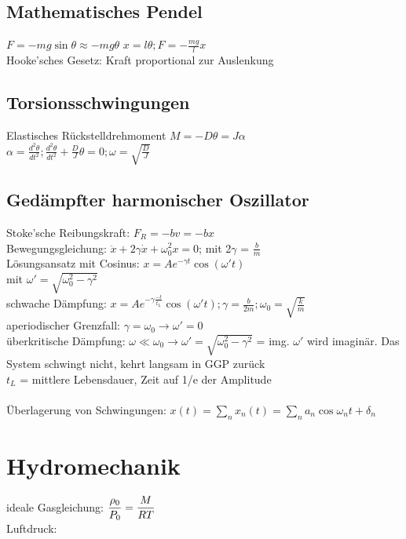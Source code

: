 \documentclass[fs, footer]{latex4ei}
\begin{document}
\begin{multicols*}{4}
\subsection{Mathematisches Pendel} $F = -mg \sin \theta \approx -mg \theta$ %
$x = l\theta ; F=-\frac{mg}{l}x$\\
Hooke'sches Gesetz: Kraft proportional zur Auslenkung\\
\subsection{Torsionsschwingungen}
Elastisches Rückstelldrehmoment $M = -D\theta = J\alpha$\\
$\alpha = \frac{d^2 \theta}{dt^2}; \frac{d^2\theta}{dt^2}+\frac{D}{J}\theta	= 0; \omega = \sqrt{\frac{D}{J}}$\\
\subsection{Gedämpfter harmonischer Oszillator}
Stoke'sche Reibungskraft: $F_R = -bv = -bx$\\
Bewegungsgleichung: $\ddot{x} + 2\gamma \dot{x} + \omega_0^2x = 0$; mit 2$\gamma$ = $\frac{b}{m}$\\
Lösungsansatz mit Cosinus: $x = Ae^{-\gamma t} \cos(\omega 't)$ \\mit $\omega ' = \sqrt{\omega_0^2-\gamma^2}$\\
schwache Dämpfung: $x = Ae^{-\gamma \frac{-t}{t_L}} \cos(\omega 't); \gamma = \frac{b}{2m}; \omega_0 = \sqrt{\frac{k}{m}}$\\
aperiodischer Grenzfall: $\gamma = \omega_0 \rightarrow	\omega' = 0$\\
überkritische Dämpfung: $\omega \ll \omega_0 \rightarrow \omega' = \sqrt{\omega_0^2 - \gamma^2}$ = img. $\omega'$ wird imaginär. Das System schwingt nicht, kehrt langsam in GGP zurück\\ 
$t_L$ = mittlere Lebensdauer, Zeit auf 1/e der Amplitude\\
\\Überlagerung von Schwingungen: $x(t)=\sum_nx_n(t)=\sum_na_n\cos{\omega_nt+\delta_n}$\\

\section{Hydromechanik}
ideale Gasgleichung: $ \dfrac{\rho _0}{P_0} = \dfrac{M}{RT}$\\
Luftdruck:


\end{multicols*}
\end{document}
